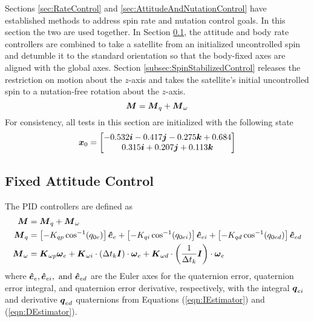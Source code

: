Sections \ref{sec:RateControl} and \ref{sec:AttitudeAndNutationControl} have established methods to address spin rate and nutation control goals.  In this section the two are used together.  In Section \ref{subsec:FixedAttitudeControl}, the attitude and body rate controllers are combined to take a satellite from an initialized uncontrolled spin and detumble it to the standard orientation so that the body-fixed axes are aligned with the global axes.  Section \ref{subsec:SpinStabilizedControl} releases the restriction on motion about the $z$-axis and takes the satellite's initial uncontrolled spin to a nutation-free rotation about the $z$-axis.
\begin{equation}
    \boldsymbol{M} = \boldsymbol{M}_{q} + \boldsymbol{M}_{\omega}
\end{equation}
For consistency, all tests in this section are initialized with the following state
\begin{equation}
  \boldsymbol{x}_0 = \begin{bmatrix} -0.532 \boldsymbol{i} -0.417 \boldsymbol{j} -0.275 \boldsymbol{k} +0.684 \\ 0.315 \boldsymbol{i} +0.207 \boldsymbol{j} +0.113 \boldsymbol{k} \end{bmatrix}
  \label{eqn:attitude_and_body_rate_control_ic}
\end{equation}

\subsection{Fixed Attitude Control}
\label{subsec:FixedAttitudeControl}
The PID controllers are defined as
\begin{equation}
  \begin{aligned}
    \boldsymbol{M} &= \boldsymbol{M}_{q} + \boldsymbol{M}_{\omega} \\
    \boldsymbol{M}_{q} &= \left[- K_{qp} \cos^{-1} (q_{0e}) \right] \boldsymbol{\hat{e}}_e + \left[- K_{qi} \cos^{-1} (q_{0ei}) \right] \boldsymbol{\hat{e}}_{ei} + \left[- K_{qd} \cos^{-1} (q_{0ed}) \right] \boldsymbol{\hat{e}}_{ed} \\
    \boldsymbol{M}_{\omega} &= \boldsymbol{K}_{\omega p} \boldsymbol{\omega}_e + \boldsymbol{K}_{\omega i} \cdot (\Delta t_k \boldsymbol{I})\cdot \boldsymbol{\omega}_e + \boldsymbol{K}_{\omega d} \cdot \left(\frac{1}{\Delta t_k} \boldsymbol{I}\right) \cdot \boldsymbol{\omega}_e
  \end{aligned}
\end{equation}
where $\boldsymbol{\hat{e}}_e, \boldsymbol{\hat{e}}_{ei}, \text{ and } \boldsymbol{\hat{e}}_{ed}$ are the Euler axes for the quaternion error, quaternion error integral, and quaternion error derivative, respectively, with the integral $\boldsymbol{q}_{ei}$ and derivative $\boldsymbol{q}_{ed}$ quaternions from Equations (\ref{eqn:IEstimator}) and (\ref{eqn:DEstimator}).

